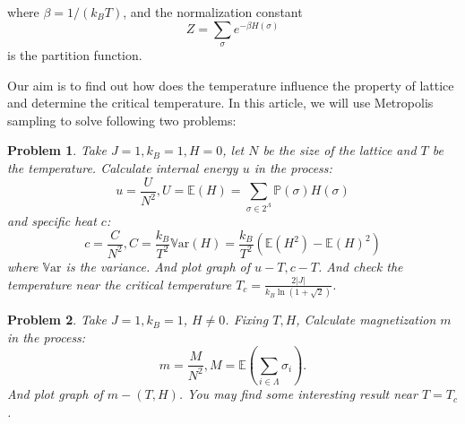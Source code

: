\documentclass[11pt,openany]{book}              %
\newtheorem{problem}{Problem}
\begin{document}
where \( \beta =1/(k_{B}T)\), and the normalization constant
\[ Z=\sum _{\sigma }e^{-\beta H(\sigma )}\]
is the partition function.

Our aim is to find out how does the temperature influence the property of lattice and determine the critical temperature.
In this article, we will use Metropolis sampling to solve following two problems:

\begin{problem}\label{pro:1}
  Take \(J=1, k_B=1, H=0\), let \(N\) be the size of the lattice and \(T\) be the temperature.
  Calculate internal energy \(u\) in the process:
  \begin{equation}
    u=\frac{U}{N^2},U=\mathbb{E}(H)=\sum_{\sigma\in 2^\Lambda}\mathbb{P}(\sigma)H( \sigma)
  \end{equation}
  and specific heat \(c\):
  \begin{equation}
    c=\frac{C}{N^2}, C=\frac{k_B}{T^2}\mathbb{V}\mathrm{ar}(H)=\frac{k_B}{T^2}( \mathbb{E}( H^2)-\mathbb{E}( H)^2)
  \end{equation}
  where \(\mathbb{V}\mathrm{ar}\) is the variance.
  And plot graph of \(u-T, c-T\).
  And check the temperature near the critical temperature \(T_c = \frac{2| J|}{k_B \ln ( 1+\sqrt{2})}\).

\end{problem}
\begin{problem}\label{pro:2}
  Take \(J=1, k_B=1\), \(H \neq 0\). Fixing \(T, H\),
  Calculate magnetization \(m\) in the process:
  \begin{equation}
    m=\frac{M}{N^2}, M=\mathbb{E}(\sum_{i \in \Lambda} \sigma_i ).
  \end{equation}
  And plot graph of \(m-(T, H)\). You may find some interesting result near \(T = T_c\).

\end{problem}
\end{document}
